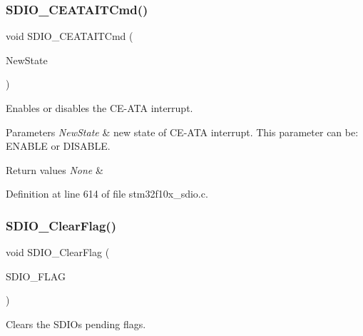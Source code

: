 \subsubsection{\texorpdfstring{S\+D\+I\+O\+\_\+\+C\+E\+A\+T\+A\+I\+T\+Cmd()}{SDIO\_CEATAITCmd()}}
{\footnotesize\ttfamily void S\+D\+I\+O\+\_\+\+C\+E\+A\+T\+A\+I\+T\+Cmd (\begin{DoxyParamCaption}\item[{\hyperlink{group___exported__types_gac9a7e9a35d2513ec15c3b537aaa4fba1}{Functional\+State}}]{New\+State }\end{DoxyParamCaption})}



Enables or disables the C\+E-\/\+A\+TA interrupt. 


\begin{DoxyParams}{Parameters}
{\em New\+State} & new state of C\+E-\/\+A\+TA interrupt. This parameter can be\+: E\+N\+A\+B\+LE or D\+I\+S\+A\+B\+LE. \\
\hline
\end{DoxyParams}

\begin{DoxyRetVals}{Return values}
{\em None} & \\
\hline
\end{DoxyRetVals}


Definition at line 614 of file stm32f10x\+\_\+sdio.\+c.

\mbox{\label{group___s_d_i_o___private___functions_ga7aff4efdeb528229135f9f285e53518a}} 
\subsubsection{\texorpdfstring{S\+D\+I\+O\+\_\+\+Clear\+Flag()}{SDIO\_ClearFlag()}}
{\footnotesize\ttfamily void S\+D\+I\+O\+\_\+\+Clear\+Flag (\begin{DoxyParamCaption}\item[{uint32\+\_\+t}]{S\+D\+I\+O\+\_\+\+F\+L\+AG }\end{DoxyParamCaption})}



Clears the S\+D\+IO\textquotesingle{}s pending flags. 


